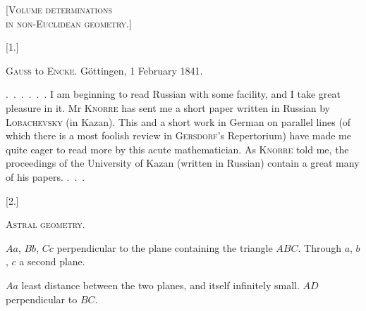 \clearpage
{}%
\begin{center}
{\Large\textsc{[Volume determinations\\ in non-Euclidean geometry.]}}



[1.]

\textsc{Gauss} to \textsc{Encke}. Göttingen, 1 February 1841.
\end{center}


\mbox{.\ .\ .\ .\ .\ .} I am beginning to read Russian with some facility, and
I take great pleasure in it. Mr \textsc{Knorre} has sent me a short paper
written in Russian by \textsc{Lobachevsky} (in Kazan). This and
a short work in German on parallel lines
(of which there is a most foolish review in \textsc{Gersdorf}'s Repertorium) have made me
quite eager to read more by this acute mathematician. As
\textsc{Knorre} told me, the proceedings of the University of Kazan (written in Russian)
contain a great many of his papers. \mbox{.\ .\ .}

\begin{center}


[2.]

\textsc{Astral geometry.}
\end{center}

\begin{center}\end{center}


$Aa$, $Bb$, $Cc$ perpendicular to the plane containing the triangle $ABC$. Through $a$, $b$, $c$
a second plane.


$Aa$ least distance between the two planes, and itself infinitely small. $AD$ perpendicular
to $BC$.
